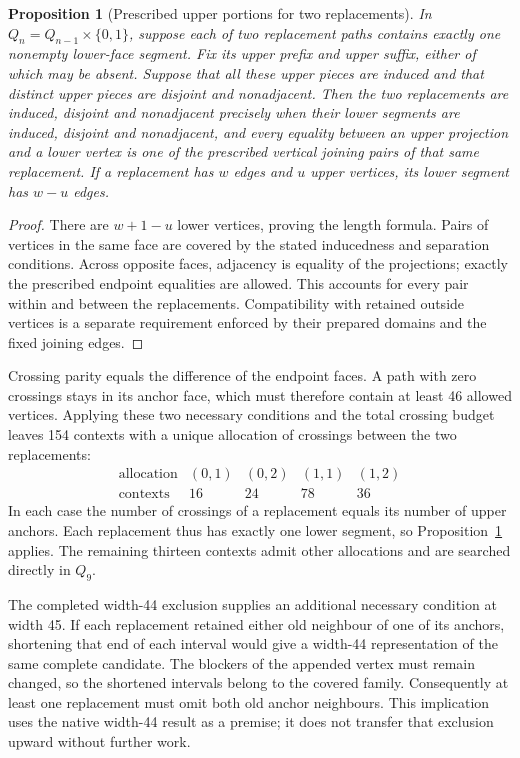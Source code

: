 \documentclass[11pt,a4paper]{article}
\newtheorem{proposition}[theorem]{Proposition}
\theoremstyle{definition}
\theoremstyle{remark}
\begin{document}
\begin{proposition}[Prescribed upper portions for two replacements]
\label{prop:twofixedupper228}
In $Q_n=Q_{n-1}\times\{0,1\}$, suppose each of two replacement paths
contains exactly one nonempty lower-face segment. Fix its upper prefix
and upper suffix, either of which may be absent. Suppose that all these
upper pieces are induced and that distinct upper pieces are disjoint
and nonadjacent. Then the two replacements are induced, disjoint and
nonadjacent precisely when their lower segments are induced, disjoint
and nonadjacent, and every equality between an upper projection and a
lower vertex is one of the prescribed vertical joining pairs of that
same replacement. If a replacement has $w$ edges and $u$ upper vertices,
its lower segment has $w-u$ edges.
\end{proposition}
\begin{proof}
There are $w+1-u$ lower vertices, proving the length formula. Pairs of
vertices in the same face are covered by the stated inducedness and
separation conditions. Across opposite faces, adjacency is equality of
the projections; exactly the prescribed endpoint equalities are allowed.
This accounts for every pair within and between the replacements.
Compatibility with retained outside vertices is a separate requirement
enforced by their prepared domains and the fixed joining edges.
\end{proof}

Crossing parity equals the difference of the endpoint faces. A path
with zero crossings stays in its anchor face, which must therefore
contain at least 46 allowed vertices. Applying these two necessary
conditions and the total crossing budget leaves 154 contexts with a
unique allocation of crossings between the two replacements:
\[
\begin{array}{c|rrrr}
\text{allocation}&(0,1)&(0,2)&(1,1)&(1,2)\\\hline
\text{contexts}&16&24&78&36
\end{array}
\]
In each case the number of crossings of a replacement equals its number
of upper anchors. Each replacement thus has exactly one lower segment,
so Proposition~\ref{prop:twofixedupper228} applies. The remaining thirteen
contexts admit other allocations and are searched directly in $Q_9$.

The completed width-44 exclusion supplies an additional necessary
condition at width 45. If each replacement retained either old neighbour
of one of its anchors, shortening that end of each interval would give
a width-44 representation of the same complete candidate. The blockers
of the appended vertex must remain changed, so the shortened intervals
belong to the covered family. Consequently at least one replacement
must omit both old anchor neighbours. This implication uses the native
width-44 result as a premise; it does not transfer that exclusion upward
without further work.
\end{document}
